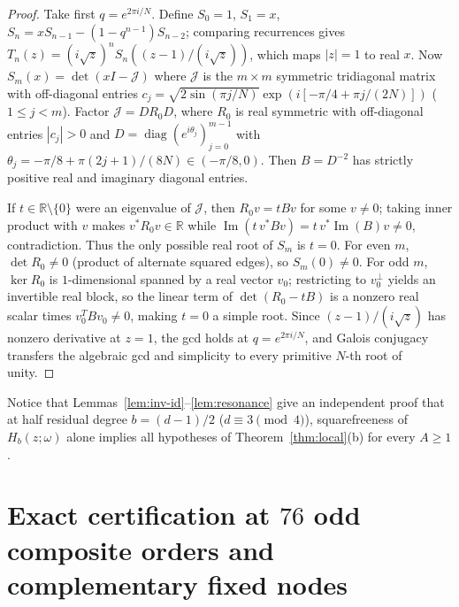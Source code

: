\documentclass[11pt,reqno]{amsart}
\numberwithin{equation}{section}
\theoremstyle{definition}
\theoremstyle{remark}
\newcommand{\R}{\mathbb{R}}
\begin{document}
\begin{proof}
Take first $q=e^{2\pi i/N}$. Define $S_0=1$, $S_1=x$, $S_n=xS_{n-1}-(1-q^{n-1})S_{n-2}$; comparing recurrences gives $T_n(z)=(i\sqrt{z})^n S_n((z-1)/(i\sqrt{z}))$, which maps $|z|=1$ to real $x$. Now $S_m(x)=\det(xI-\mathcal{J})$ where $\mathcal{J}$ is the $m\times m$ symmetric tridiagonal matrix with off-diagonal entries $c_j=\sqrt{2\sin(\pi j/N)}\exp(i[-\pi/4+\pi j/(2N)])$ ($1\le j<m$). Factor $\mathcal{J}=DR_0D$, where $R_0$ is real symmetric with off-diagonal entries $|c_j|>0$ and $D=\operatorname{diag}(e^{i\theta_j})_{j=0}^{m-1}$ with $\theta_j=-\pi/8+\pi(2j+1)/(8N)\in(-\pi/8,0)$. Then $B=D^{-2}$ has strictly positive real and imaginary diagonal entries.

If $t\in\R\setminus\{0\}$ were an eigenvalue of $\mathcal{J}$, then $R_0 v = t B v$ for some $v\neq 0$; taking inner product with $v$ makes $v^*R_0v\in\R$ while $\operatorname{Im}(t\,v^*Bv)=t\,v^*\operatorname{Im}(B)v\neq 0$, contradiction. Thus the only possible real root of $S_m$ is $t=0$. For even $m$, $\det R_0\neq 0$ (product of alternate squared edges), so $S_m(0)\neq 0$. For odd $m$, $\ker R_0$ is $1$-dimensional spanned by a real vector $v_0$; restricting to $v_0^\perp$ yields an invertible real block, so the linear term of $\det(R_0-tB)$ is a nonzero real scalar times $v_0^T B v_0\neq 0$, making $t=0$ a simple root. Since $(z-1)/(i\sqrt{z})$ has nonzero derivative at $z=1$, the gcd holds at $q=e^{2\pi i/N}$, and Galois conjugacy transfers the algebraic gcd and simplicity to every primitive $N$-th root of unity.
\end{proof}

Notice that Lemmas~\ref{lem:inv-id}--\ref{lem:resonance} give an independent proof that at half residual degree $b=(d-1)/2$ ($d\equiv 3\pmod 4$), squarefreeness of $H_b(z;\omega)$ alone implies all hypotheses of Theorem~\ref{thm:local}(b) for every $A\ge 1$.

\section{Exact certification at $76$ odd composite orders and complementary fixed nodes}
\label{sec:76-cert}
\end{document}
